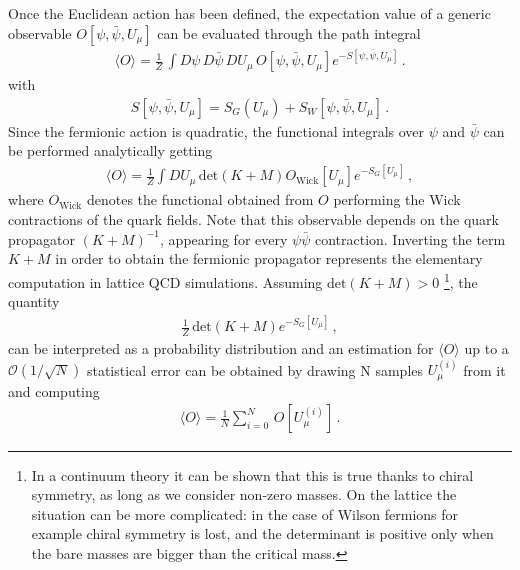 %
Once the Euclidean action has been defined, the expectation value of a generic observable 
$O\left[\psi,\bar{\psi},U_{\mu}\right]$ can be evaluated
through the path integral
\begin{align} 
    \label{eq:lattice_path_integral}
    \langle O\rangle = \frac{1}{Z}\,\int D\psi\, D\bar{\psi}\,DU_{\mu}\,
    O\left[\psi,\bar{\psi},U_{\mu}\right]e^{-S[\psi,\bar{\psi},U_{\mu}]}\,.
\end{align}
with 
\begin{align}
    S[\psi,\bar{\psi},U_{\mu}] = S_G\left(U_{\mu}\right) + S_W\left[\psi,\bar{\psi}, U_{\mu}\right]\,.
\end{align}
Since the fermionic action is quadratic,
the functional integrals over $\psi$ and $\bar{\psi}$ can be performed analytically getting
\begin{align}
    \label{eq:integrated_path_integral}
    \langle O\rangle = \frac{1}{Z}\int DU_{\mu}\,\text{det}\left(K+M\right)
    O_{\text{Wick}}\left[U_{\mu}\right]e^{-S_G[U_{\mu}]}\,,
\end{align}
where $O_{\text{Wick}}$ denotes the functional obtained from $O$ performing the Wick contractions 
of the quark fields. Note that this observable depends on the quark propagator $\left(K+M\right)^{-1}$,
appearing for every $\psi\bar{\psi}$ contraction. Inverting the term $K+M$ in order to obtain the fermionic propagator
represents the elementary computation in lattice QCD simulations.
Assuming $\text{det}\left(K+M\right)>0$ \footnote{In a continuum theory it 
can be shown that this is true thanks to chiral symmetry, as long as we consider non-zero masses.
On the lattice the situation can be more complicated: in the case of Wilson fermions for example chiral symmetry is lost,
and the determinant is positive only when the bare masses are bigger than the critical mass.}, the quantity
\begin{align}
    \label{eq:prob_distribution}
    \frac{1}{Z}\,\text{det}\left(K+M\right)e^{-S_G[U_{\mu}]}\,,
\end{align}
can be interpreted as a probability distribution and an estimation
for $\langle O \rangle$ up to a $\mathcal{O}\left(1/\sqrt{N}\right)$ statistical error can be obtained by drawing
N samples $U_{\mu}^{(i)}$ from it and computing
\begin{align}
    \label{eq:average_O_lattice}
    \langle O \rangle = \frac{1}{N}\sum_{i=0}^N \, O\left[U_{\mu}^{(i)}\right]\,.
\end{align} 
